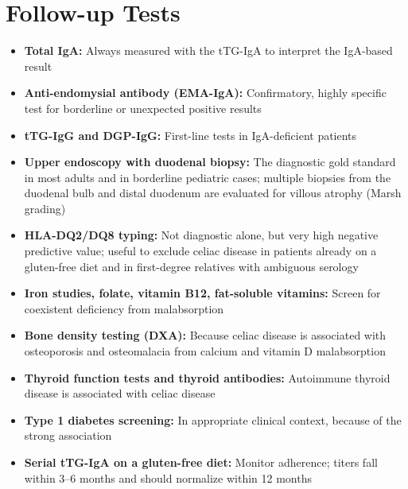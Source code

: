 \section*{Follow-up Tests}
\begin{itemize}
  \item \textbf{Total IgA:} Always measured with the tTG-IgA to interpret the IgA-based result
  \item \textbf{Anti-endomysial antibody (EMA-IgA):} Confirmatory, highly specific test for borderline or unexpected positive results
  \item \textbf{tTG-IgG and DGP-IgG:} First-line tests in IgA-deficient patients
  \item \textbf{Upper endoscopy with duodenal biopsy:} The diagnostic gold standard in most adults and in borderline pediatric cases; multiple biopsies from the duodenal bulb and distal duodenum are evaluated for villous atrophy (Marsh grading)
  \item \textbf{HLA-DQ2/DQ8 typing:} Not diagnostic alone, but very high negative predictive value; useful to exclude celiac disease in patients already on a gluten-free diet and in first-degree relatives with ambiguous serology
  \item \textbf{Iron studies, folate, vitamin B12, fat-soluble vitamins:} Screen for coexistent deficiency from malabsorption
  \item \textbf{Bone density testing (DXA):} Because celiac disease is associated with osteoporosis and osteomalacia from calcium and vitamin D malabsorption
  \item \textbf{Thyroid function tests and thyroid antibodies:} Autoimmune thyroid disease is associated with celiac disease
  \item \textbf{Type 1 diabetes screening:} In appropriate clinical context, because of the strong association
  \item \textbf{Serial tTG-IgA on a gluten-free diet:} Monitor adherence; titers fall within 3--6 months and should normalize within 12 months
\end{itemize}

